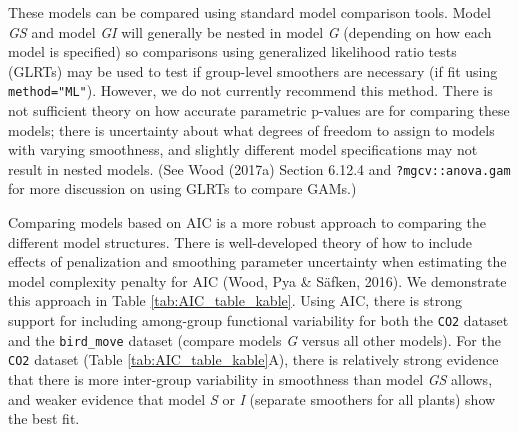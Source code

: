 \documentclass[12pt]{article}
\begin{document}
These models can be compared using standard model comparison tools.
Model \emph{GS} and model \emph{GI} will generally be nested in model
\emph{G} (depending on how each model is specified) so comparisons using
generalized likelihood ratio tests (GLRTs) may be used to test if
group-level smoothers are necessary (if fit using \texttt{method="ML"}).
However, we do not currently recommend this method. There is not
sufficient theory on how accurate parametric p-values are for comparing
these models; there is uncertainty about what degrees of freedom to
assign to models with varying smoothness, and slightly different model
specifications may not result in nested models. (See Wood (2017a)
Section 6.12.4 and \texttt{?mgcv::anova.gam} for more discussion on
using GLRTs to compare GAMs.)

Comparing models based on AIC is a more robust approach to comparing the
different model structures. There is well-developed theory of how to
include effects of penalization and smoothing parameter uncertainty when
estimating the model complexity penalty for AIC (Wood, Pya \& Säfken,
2016). We demonstrate this approach in Table \ref{tab:AIC_table_kable}.
Using AIC, there is strong support for including among-group functional
variability for both the \texttt{CO2} dataset and the
\texttt{bird\_move} dataset (compare models \emph{G} versus all other
models). For the \texttt{CO2} dataset (Table
\ref{tab:AIC_table_kable}A), there is relatively strong evidence that
there is more inter-group variability in smoothness than model \emph{GS}
allows, and weaker evidence that model \emph{S} or \emph{I} (separate
smoothers for all plants) show the best fit.
\end{document}
